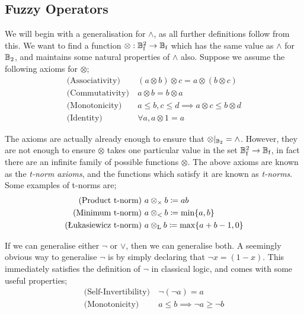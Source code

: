 \documentclass[conference]{report}
\begin{document}
\subsection{Fuzzy Operators}

\def\prodand{\custop{\otimes_\times}}
\def\minand{\custop{\otimes_<}}
\def\lukand{\custop{\otimes_\text{L}}}
\def\draand{\custop{\otimes_\text{D}}}

\def\prodor{\custop{\oplus_\times}}
\def\minor{\custop{\oplus_<}}
\def\lukor{\custop{\oplus_\text{L}}}

We will begin with a generalisation for $\land$, as all further definitions follow from this. We want to find a function $\otimes : \mathbb{B}_\text{f}^2 \to \mathbb{B}_\text{f}$ which has the same value as $\land$ for $\mathbb{B}_2$, and maintains some natural properties of $\land$ also. Suppose we assume the following axioms for $\otimes$;
$$
\begin{aligned}
\text{(Associativity)}&\ (a \otimes b) \otimes c = a \otimes (b \otimes c) \\
\text{(Commutativity)}&\ a \otimes b = b \otimes a \\
\text{(Monotonicity)}&\ a \leq b, c \leq d \implies a \otimes c \leq b \otimes d \\
\text{(Identity)}&\ \forall a, a \otimes 1 = a
\end{aligned}
$$
 
The axioms are actually already enough to ensure that $\otimes |_{\mathbb{B}_2} = \land$. However, they are not enough to ensure $\otimes$ takes one particular value in the set $\mathbb{B}_\text{f}^2 \to \mathbb{B}_\text{f}$, in fact there are an infinite family of possible functions $\otimes$. The above axioms are known as the \textit{t-norm axioms}, and the functions which satisfy it are known as \textit{t-norms}. Some examples of t-norms are;
$$
\begin{aligned}
    \text{(Product t-norm)}&\ a \prodand b \coloneqq ab \\
    \text{(Minimum t-norm)}&\ a \minand b \coloneqq \min\{a,b\} \\
    \text{(Łukasiewicz t-norm)}&\ a \lukand b \coloneqq \max\{a+b-1,0\}
\end{aligned}
$$

If we can generalise either $\lnot$ or $\lor$, then we can generalise both. A seemingly obvious way to generalise $\lnot$ is by simply declaring that $\lnot x = (1 - x)$. This immediately satisfies the definition of $\lnot$ in classical logic, and comes with some useful properties;
$$
\begin{aligned}
\text{(Self-Invertibility)}&\ \lnot(\lnot a) = a \\
\text{(Monotonicity)}&\ a \leq b \implies \lnot a \geq \lnot b \\
\end{aligned}
$$
\end{document}
